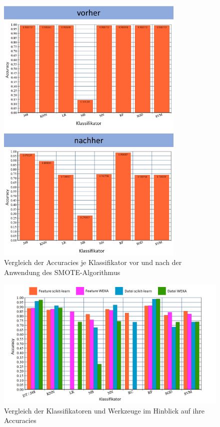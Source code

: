 \begin{figure}[]
    \centering
    \includegraphics[width=0.8\textwidth]{images/smoted}
    \caption{Vergleich der Accuracies je Klassifikator vor und nach der Anwendung des SMOTE-Algorithmus\label{fig:smoted}}
\end{figure}

\begin{figure}[]
    \centering
    \includegraphics[width=\textwidth]{images/Vergleich1}
    \caption{Vergleich der Klassifikatoren und Werkzeuge im Hinblick auf ihre Accuracies\label{fig:vergl1}}
\end{figure}

\cleardoublepage